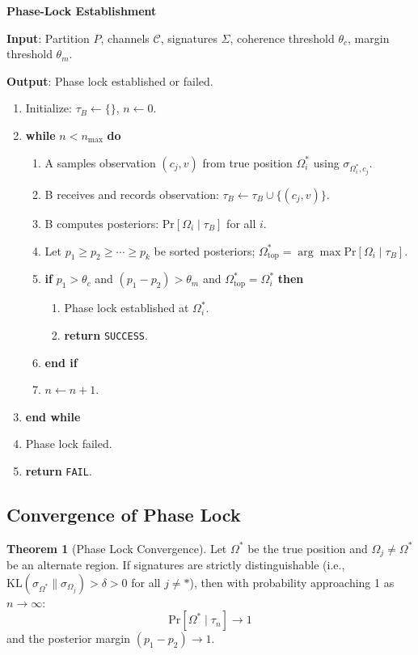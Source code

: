 \documentclass[11pt,a4paper]{article}
\theoremstyle{definition}
\newtheorem{theorem}[definition]{Theorem}
\newcommand{\pr}[1]{\mathrm{Pr}\left[#1\right]}
\newcommand{\given}{\mid}
\begin{document}
\begin{algorithm}
\textbf{Phase-Lock Establishment}

\textbf{Input}: Partition $P$, channels $\mathcal{C}$, signatures $\Sigma$, coherence threshold $\theta_c$, margin threshold $\theta_m$.

\textbf{Output}: Phase lock established or failed.

\begin{enumerate}
\item Initialize: $\tau_B \leftarrow \{\}$, $n \leftarrow 0$.
\item \textbf{while} $n < n_{\max}$ \textbf{do}
  \begin{enumerate}
  \item A samples observation $(c_j, v)$ from true position $\Omega_i^*$ using $\sigma_{\Omega_i^*, c_j}$.
  \item B receives and records observation: $\tau_B \leftarrow \tau_B \cup \{(c_j, v)\}$.
  \item B computes posteriors: $\pr{\Omega_i \given \tau_B}$ for all $i$.
  \item Let $p_1 \geq p_2 \geq \cdots \geq p_k$ be sorted posteriors; $\Omega^*_{\text{top}} = \arg\max \pr{\Omega_i \given \tau_B}$.
  \item \textbf{if} $p_1 > \theta_c$ and $(p_1 - p_2) > \theta_m$ and $\Omega^*_{\text{top}} = \Omega_i^*$ \textbf{then}
    \begin{enumerate}
    \item Phase lock established at $\Omega_i^*$.
    \item \textbf{return} \texttt{SUCCESS}.
    \end{enumerate}
  \item \textbf{end if}
  \item $n \leftarrow n + 1$.
  \end{enumerate}
\item \textbf{end while}
\item Phase lock failed.
\item \textbf{return} \texttt{FAIL}.
\end{enumerate}
\end{algorithm}

\subsection{Convergence of Phase Lock}

\begin{theorem}[Phase Lock Convergence]
Let $\Omega^*$ be the true position and $\Omega_j \neq \Omega^*$ be an alternate region. If signatures are strictly distinguishable (i.e., $\mathrm{KL}(\sigma_{\Omega^*} \| \sigma_{\Omega_j}) > \delta > 0$ for all $j \neq *$), then with probability approaching 1 as $n \to \infty$:
\[
\pr{\Omega^* \given \tau_n} \to 1
\]
and the posterior margin $(p_1 - p_2) \to 1$.
\end{theorem}
\end{document}
